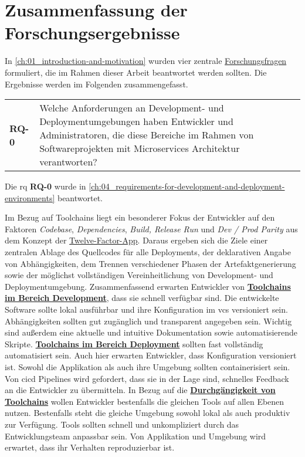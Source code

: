 \section{Zusammenfassung der Forschungsergebnisse}
\label{sec:07-01_summary-of-research-results}

In \autoref{ch:01_introduction-and-motivation} wurden vier zentrale \hyperref[sec:01-03_objectives-and-research-questions]{Forschungsfragen} formuliert, die im Rahmen dieser Arbeit beantwortet werden sollten. Die Ergebnisse werden im Folgenden zusammengefasst.

\vspace{1em}
\begin{table}[H]
    \centering
    \begin{tabular}{p{} p{}}
        \textbf{RQ-0} & Welche Anforderungen an Development- und Deploymentumgebungen haben Entwickler und Administratoren, die diese Bereiche im Rahmen von Softwareprojekten mit Microservices Architektur verantworten? \\
    \end{tabular}
\end{table}

Die \acrlong{rq} \textbf{RQ-0} wurde in \autoref{ch:04_requirements-for-development-and-deployment-environments} beantwortet.

Im Bezug auf Toolchains liegt ein besonderer Fokus der Entwickler auf den Faktoren \textit{Codebase}, \textit{Dependencies}, \textit{Build, Release Run} und \textit{Dev / Prod Parity} aus dem Konzept der \hyperref[sec:03-05_concept-of-twelve-factor-app]{Twelve-Factor-App}. Daraus ergeben sich die Ziele einer zentralen Ablage des Quellcodes für alle Deployments, der deklarativen Angabe von Abhängigkeiten, dem Trennen verschiedener Phasen der Artefaktgenerierung sowie der möglichst vollständigen Vereinheitlichung von Development- und Deploymentumgebung. Zusammenfassend erwarten Entwickler von \textbf{\hyperref[subsec:04-02-02_toolchains-in-development]{Toolchains im Bereich Development}}, dass sie schnell verfügbar sind. Die entwickelte Software sollte lokal ausführbar und ihre Konfiguration im \Gls{vcs} versioniert sein. Abhängigkeiten sollten gut zugänglich und transparent angegeben sein. Wichtig sind außerdem eine aktuelle und intuitive Dokumentation sowie automatisierende Skripte. \textbf{\hyperref[subsec:04-02-03_toolchains-in-deployment]{Toolchains im Bereich Deployment}} sollten fast vollständig automatisiert sein. Auch hier erwarten Entwickler, dass Konfiguration versioniert ist. Sowohl die Applikation als auch ihre Umgebung sollten containerisiert sein. Von \Gls{cicd} Pipelines wird gefordert, dass sie in der Lage sind, schnelles Feedback an die Entwickler zu übermitteln. In Bezug auf die \textbf{\hyperref[subsec:04-02-04_consistency-of-toolchains]{Durchgängigkeit von Toolchains}} wollen Entwickler bestenfalls die gleichen Tools auf allen Ebenen nutzen. Bestenfalls steht die gleiche Umgebung sowohl lokal als auch produktiv zur Verfügung. Tools sollten schnell und unkompliziert durch das Entwicklungsteam anpassbar sein. Von Applikation und Umgebung wird erwartet, dass ihr Verhalten reproduzierbar ist.

